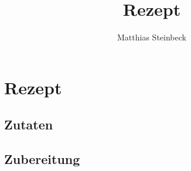 \documentclass[10pt,a4paper]{article}
\author{Matthias Steinbeck}
\title{Rezept}
\begin{document}
\section*{Rezept}
\subsection*{Zutaten}
\subsection*{Zubereitung}
\end{document}
